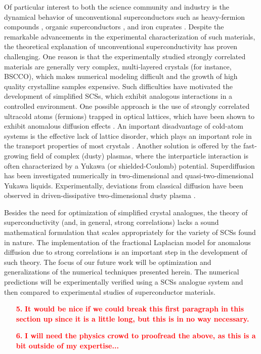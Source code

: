\documentclass[final,1p,times]{elsarticle}
\theoremstyle{remark}
\theoremstyle{definition}
\newcommand{\josh}[1]{\textcolor{red}{\textbf{#1}}}
\begin{document}
Of particular interest to both the science community and industry is the dynamical behavior of unconventional superconductors such as heavy-fermion compounds \cite{pfleiderer2009superconducting}, organic superconductors \cite{ishiguro2012organic}, and iron cuprates \cite{stewart2011superconductivity}. Despite the remarkable advancements in the experimental characterization of such materials, the theoretical explanation of unconventional superconductivity has proven challenging. One reason is that the experimentally studied strongly correlated materials are generally very complex, multi-layered crystals (for instance, BSCCO), which makes numerical modeling difficult and the growth of high quality crystalline samples expensive. Such difficulties have motivated the development of simplified SCSs, which exhibit analogous interactions in a controlled environment. One possible approach is the use of strongly correlated ultracold atoms (fermions) trapped in optical lattices, which have been shown to exhibit anomalous diffusion effects \cite{barkai2014area,kessler2012theory,mazurenko2017cold}. An important disadvantage of cold-atom systems is the effective lack of lattice disorder, which plays an important role in the transport properties of most crystals \cite{polini2013artificial}. Another solution is offered by the fast-growing field of complex (dusty) plasmas, where the interparticle interaction is often characterized by a Yukawa (or shielded-Coulomb) potential. Superdiffusion has been investigated numerically in two-dimensional \cite{liu2007superdiffusion,ott2009anomalous,liu2006test} and quasi-two-dimensional \cite{ott2008superdiffusion} Yukawa liquids. Experimentally, deviations from classical diffusion have been observed in driven-dissipative two-dimensional dusty plasma \cite{liu2008superdiffusion}.

Besides the need for optimization of simplified crystal analogues, the theory of superconductivity (and, in general, strong correlations) lacks a sound mathematical formulation that scales appropriately for the variety of SCSs found in nature. The implementation of the fractional Laplacian model for anomalous diffusion due to strong correlations is an important step in the development of such theory. The focus of our future work will be optimization and generalizations of the numerical techniques presented herein. The numerical predictions will be experimentally verified using a SCSs analogue system and then compared to experimental studies of superconductor materials.

\begin{itemize}
\item[\josh{5.}] \josh{It would be nice if we could break this first paragraph in this section up since it is a little long, but this is in no way necessary.}

\item[\josh{6.}] \josh{I will need the physics crowd to proofread the above, as this is a bit outside of my expertise...}
\end{itemize}
\end{document}
